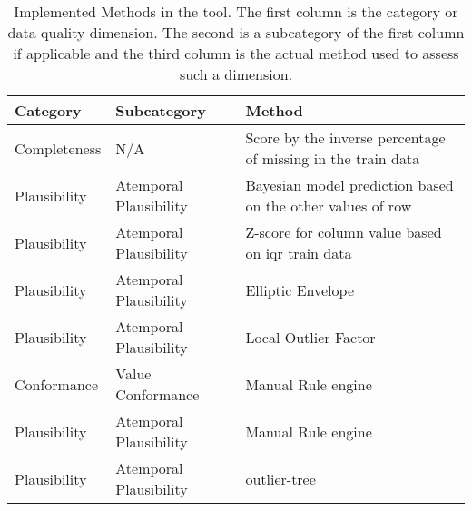 \begin{table}[htpb]
\caption{Implemented Methods in the tool. The first column is the category or data quality dimension. The second is a subcategory of the first column if applicable and the third column is the actual method used to assess such a dimension.} \label{tab:methods}
\renewcommand{\arraystretch}{1.4}
\setlength{\tabcolsep}{10pt}

\begin{tabularx}{\textwidth}{ p{2cm} p{3.5cm} X }
\hline
 Category   & Subcategory           & Method   \\ \hline
Completeness     & N/A               & Score by the inverse percentage of missing in the train data         \\ 
Plausibility & Atemporal Plausibility & Bayesian model prediction based on the other values of row \\ 
Plausibility & Atemporal Plausibility         & Z-score for column value based on \acs{iqr} train data       \\    
Plausibility & Atemporal Plausibility           & Elliptic Envelope                       \\ 
Plausibility & Atemporal Plausibility           & Local Outlier Factor                \\ 
Conformance & Value Conformance           & Manual Rule engine                           \\ 
Plausibility & Atemporal Plausibility           & Manual Rule engine                      \\ 
Plausibility & Atemporal Plausibility           & outlier-tree                      \\ 
\hline
\end{tabularx}

\end{table}

